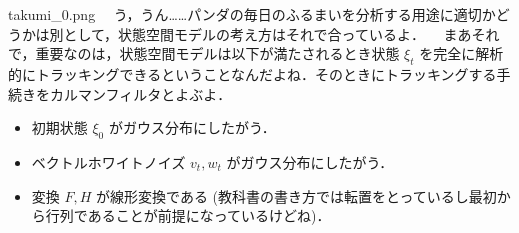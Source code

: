 \documentclass[b5paper,xelatex,ja=standard,10pt]{bxjsarticle}
\begin{document}
\begin{SERIFU}[colback=PaleGold]{takumi_0.png}
　う，うん……パンダの毎日のふるまいを分析する用途に適切かどうかは別として，状態空間モデルの考え方はそれで合っているよ．
　まあそれで，重要なのは，状態空間モデルは以下が満たされるとき状態 $\xi_t$ を完全に解析的にトラッキングできるということなんだよね．そのときにトラッキングする手続きをカルマンフィルタとよぶよ．
\begin{itemize}
  \item 初期状態 $\xi_0$ がガウス分布にしたがう．
  \item ベクトルホワイトノイズ $v_t, w_t$ がガウス分布にしたがう．
  \item 変換 $F, H$ が線形変換である (教科書の書き方では転置をとっているし最初から行列であることが前提になっているけどね)．
\end{itemize}
\end{SERIFU}


\end{document}
